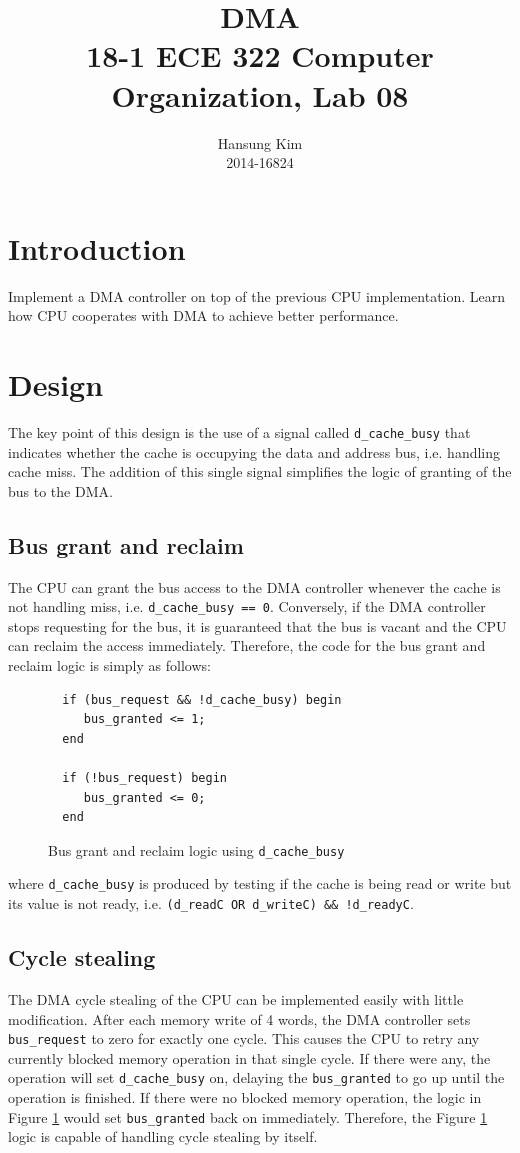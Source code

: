 \documentclass[12pt]{article}
\title{DMA \\
\large 18-1 ECE 322 Computer Organization, Lab 08}
\author{Hansung Kim \\ 2014-16824}
\date{}
\begin{document}
\maketitle

\section{Introduction}
Implement a DMA controller on top of the previous CPU implementation.
Learn how CPU cooperates with DMA to achieve better performance.

\section{Design}

The key point of this design is the use of a signal called
\verb|d_cache_busy| that indicates whether the cache is occupying the
data and address bus, i.e. handling cache miss.  The addition of this
single signal simplifies the logic of granting of the bus to the DMA.

\subsection{Bus grant and reclaim}

The CPU can grant the bus access to the DMA controller whenever the
cache is not handling miss, i.e. \verb|d_cache_busy == 0|.
Conversely, if the DMA controller stops requesting for the bus, it is
guaranteed that the bus is vacant and the CPU can reclaim the access
immediately.  Therefore, the code for the bus grant and reclaim logic
is simply as follows:

\begin{figure}[ht]
  \centering
  \begin{BVerbatim}
  if (bus_request && !d_cache_busy) begin
     bus_granted <= 1;
  end

  if (!bus_request) begin
     bus_granted <= 0;
  end
  \end{BVerbatim}
  \caption{Bus grant and reclaim logic using \texttt{d\_cache\_busy}}
  \label{fig:bus-logic}
\end{figure}

where \verb|d_cache_busy| is produced by testing if the cache is being
read or write but its value is not ready, i.e.  \texttt{(d\_readC OR
  d\_writeC) \&\& !d\_readyC}.

\subsection{Cycle stealing}
The DMA cycle stealing of the CPU can be implemented easily with
little modification.  After each memory write of 4 words, the DMA
controller sets \verb|bus_request| to zero for exactly one cycle.
This causes the CPU to retry any currently blocked memory operation in
that single cycle.  If there were any, the operation will set
\verb|d_cache_busy| on, delaying the \verb|bus_granted| to go up until
the operation is finished.  If there were no blocked memory operation,
the logic in Figure \ref{fig:bus-logic} would set \verb|bus_granted|
back on immediately.  Therefore, the Figure \ref{fig:bus-logic} logic
is capable of handling cycle stealing by itself.
\end{document}
